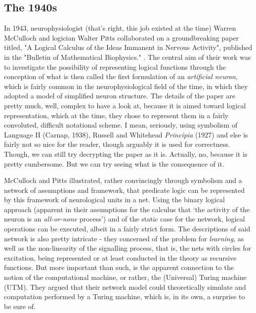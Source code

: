 \subsection{The 1940s}

In 1943, neurophysiologist (that's right, this job existed at the time) Warren McCulloch and logician Walter Pitts collaborated on a groundbreaking paper titled, "A Logical Calculus of the Ideas Immanent in Nervous Activity", published in the "Bulletin of Mathematical Biophysics." \cite{mcculloch_logical_1943}. The central aim of their work was to investigate the possibility of representing logical functions through the conception of what is then called the first formulation of an \textit{artificial neuron}, which is fairly common in the neurophysiological field of the time, in which they adopted a model of simplified neuron structure. The details of the paper are pretty much, well, complex to have a look at, because it is aimed toward logical representation, which at the time, they chose to represent them in a fairly convoluted, difficult notational scheme. I mean, seriously, using symbolism of Language II (Carnap, 1938), Russell and Whitehead \textit{Principia} (1927) and else is fairly not so nice for the reader, though arguably it is used for correctness. Though, we can still try decrypting the paper as it is. Actually, no, because it is pretty cumbersome. But we can try seeing what is the consequence of it. 

McCulloch and Pitts illustrated, rather convincingly through symbolism and a network of assumptions and framework, that predicate logic can be represented by this framework of neurological units in a net. Using the binary logical approach (apparent in their assumptions for the calculus that `the activity of the neuron is an \textit{all-or-none} process') and of the static case for the network, logical operations can be executed, albeit in a fairly strict form. The descriptions of said network is also pretty intricate - they concerned of the problem for \textit{learning}, as well as the non-linearity of the signalling process, that is, the nets with circles for excitation, being represented or at least conducted in the theory as recursive functions. But more important than such, is the apparent connection to the notion of the computational machine, or rather, the (Universal) Turing machine (UTM). They argued that their network model could theoretically simulate and computation performed by a Turing machine, which is, in its own, a surprise to be sure of. 

